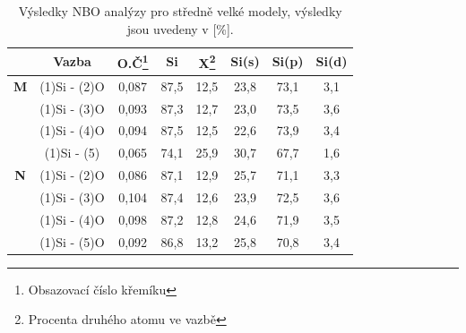 \documentclass[
digital, %
table,   %
lof,     %
lot,     %
oneside,
]{fithesis3}
\begin{document}
\begin{table}[htbp]
\begin{minipage}{\textwidth}
\caption{Výsledky NBO analýzy pro středně velké modely, výsledky jsou uvedeny v [\%].}
\begin{tabular}{|c|c|c|c|c|c|c|c|}
\hline
\label{nbo_small} &  Vazba & O.Č\footnote{Obsazovací číslo křemíku} & Si & X\footnote{Procenta druhého atomu ve  vazbě} & Si(s) & Si(p) &Si(d) \\ \hline
\textbf{M} & (1)Si - (2)O & 0,087 & 87,5  & 12,5  & 23,8  & 73,1  & 3,1  \\ \hline
& (1)Si - (3)O & 0,093 & 87,3  & 12,7  & 23,0  & 73,5  & 3,6  \\ \hline
&(1)Si - (4)O & 0,094 & 87,5  & 12,5  & 22,6  & 73,9  & 3,4  \\ \hline
& (1)Si - (5) & 0,065 & 74,1  & 25,9  & 30,7  & 67,7  & 1,6  \\ \hline
\textbf{N} & (1)Si - (2)O & 0,086 & 87,1  & 12,9  & 25,7  & 71,1  & 3,3  \\ \hline
& (1)Si - (3)O & 0,104 & 87,4  & 12,6  & 23,9  & 72,5  & 3,6  \\ \hline
& (1)Si - (4)O & 0,098 & 87,2  & 12,8  & 24,6  & 71,9  & 3,5  \\ \hline
& (1)Si - (5)O & 0,092 & 86,8  & 13,2  & 25,8  & 70,8  & 3,4  \\ \hline
\end{tabular}
\end{minipage}
\end{table}
\end{document}
